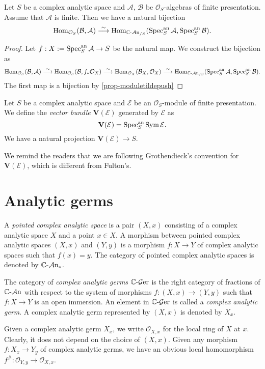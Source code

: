 \begin{proposition}\label{prop-morphismrelaffspaces}
    Let $S$ be a complex analytic space and $\mathcal{A}$, $\mathcal{B}$ be $\mathcal{O}_S$-algebras of finite presentation. Assume that $\mathcal{A}$ is finite. Then we have a natural bijection
    \[
        \operatorname{Hom}_{\mathcal{O}_S}(\mathcal{B},\mathcal{A})\stackrel{\sim}{\longrightarrow} \operatorname{Hom}_{\mathbb{C}\text{-}\mathcal{A}\mathrm{n}_{/S}}(\operatorname{Spec}^{\mathrm{an}}_S \mathcal{A},\operatorname{Spec}^{\mathrm{an}}_S \mathcal{B}).  
    \]
\end{proposition}
\begin{proof}
    Let $f:X:=\operatorname{Spec}^{\mathrm{an}}_S\mathcal{A}\rightarrow S$ be the natural map.
    We construct the bijection as
    \[
        \operatorname{Hom}_{\mathcal{O}_S}(\mathcal{B},\mathcal{A})\stackrel{\sim}{\longrightarrow} \operatorname{Hom}_{\mathcal{O}_S}(\mathcal{B},f_*\mathcal{O}_X)\stackrel{\sim}{\longrightarrow} \operatorname{Hom}_{\mathcal{O}_X}(\mathcal{B}_X,\mathcal{O}_X)\stackrel{\sim}{\longrightarrow} \operatorname{Hom}_{\mathbb{C}\text{-}\mathcal{A}\mathrm{n}_{/S}}(\operatorname{Spec}^{\mathrm{an}}_S \mathcal{A},\operatorname{Spec}^{\mathrm{an}}_S \mathcal{B}).
    \]
    The first map is a bijection by \cref{prop-moduletildepush}
\end{proof}

\begin{definition}
    Let $S$ be a complex analytic space and $\mathcal{E}$ be an $\mathcal{O}_S$-module of finite presentation. We define the \emph{vector bundle} $\mathbf{V}(\mathcal{E})$ generated by $\mathcal{E}$ as
    \[
        \mathbf{V}(\mathcal{E})=\operatorname{Spec}^{\mathrm{an}}_S \operatorname{Sym} \mathcal{E}.
    \]
    We have a natural projection $\mathbf{V}(\mathcal{E})\rightarrow S$.
\end{definition}
We remind the readers that we are following Grothendieck's convention for $\mathbf{V}(\mathcal{E})$, which is different from Fulton's.



\section{Analytic germs}

\begin{definition}\label{def-complexgerm}
    A \emph{pointed complex analytic space} is a pair $(X,x)$ consisting of a complex analytic space $X$ and a point $x\in X$. A morphism between pointed complex analytic spaces $(X,x)$ and $(Y,y)$ is a morphism $f:X\rightarrow Y$ of complex analytic spaces such that $f(x)=y$. The category of pointed complex analytic spaces is denoted by $\mathbb{C}\text{-}\mathcal{A}\mathrm{n}_*$. 
    

    The category of \emph{complex analytic germs} $\mathbb{C}\text{-}\mathcal{G}\mathrm{er}$ is the right category of fractions of $\mathbb{C}\text{-}\mathcal{A}\mathrm{n}$ with respect to the system of morphisms $f:(X,x)\rightarrow (Y,y)$ such that $f:X\rightarrow Y$ is an open immersion. An element in $\mathbb{C}\text{-}\mathcal{G}\mathrm{er}$ is called a \emph{complex analytic germ}. A complex analytic germ represented by $(X,x)$ is denoted by $X_x$.

    Given a complex analytic germ $X_x$, we write $\mathcal{O}_{X,x}$ for the local ring of $X$ at $x$. Clearly, it does not depend on the choice of $(X,x)$. Given any morphism $f:X_x\rightarrow Y_y$ of complex analytic germs, we have an obvious local homomorphism $f^{\#}:\mathcal{O}_{Y,y}\rightarrow \mathcal{O}_{X,x}$.
\end{definition}


